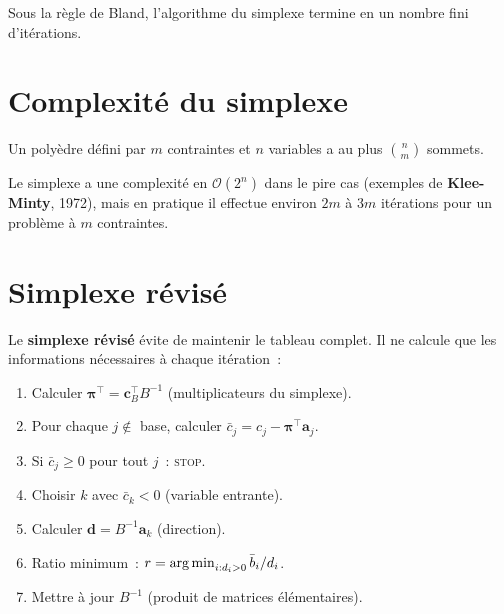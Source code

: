 \begin{theoreme}
Sous la r\`egle de Bland, l'algorithme du simplexe termine en un nombre
fini d'it\'erations.
\end{theoreme}

\section{Complexit\'e du simplexe}

\begin{proposition}
Un poly\`edre d\'efini par $m$ contraintes et $n$ variables a au plus
$\binom{n}{m}$ sommets.
\end{proposition}

\begin{remarque}
Le simplexe a une complexit\'e en $\mathcal{O}(2^n)$ dans le pire cas
(exemples de \textbf{Klee-Minty}, 1972), mais en pratique il effectue
environ $2m$ \`a $3m$ it\'erations pour un probl\`eme \`a $m$ contraintes.
\end{remarque}

\section{Simplexe r\'evis\'e}

Le \textbf{simplexe r\'evis\'e} \'evite de maintenir le tableau complet.
Il ne calcule que les informations n\'ecessaires \`a chaque it\'eration~:

\begin{algorithme}[title=\textbf{Simplexe r\'evis\'e -- une it\'eration}]
\begin{enumerate}
  \item Calculer $\boldsymbol{\pi}^\top = \mathbf{c}_B^\top B^{-1}$
        (multiplicateurs du simplexe).
  \item Pour chaque $j \notin$ base, calculer
        $\bar{c}_j = c_j - \boldsymbol{\pi}^\top \mathbf{a}_j$.
  \item Si $\bar{c}_j \ge 0$ pour tout $j$~: \textsc{stop}.
  \item Choisir $k$ avec $\bar{c}_k < 0$ (variable entrante).
  \item Calculer $\mathbf{d} = B^{-1}\mathbf{a}_k$ (direction).
  \item Ratio minimum~: $r = \operatorname*{arg\,min}_{i : d_i > 0} \bar{b}_i / d_i$.
  \item Mettre \`a jour $B^{-1}$ (produit de matrices \'el\'ementaires).
\end{enumerate}
\end{algorithme}

